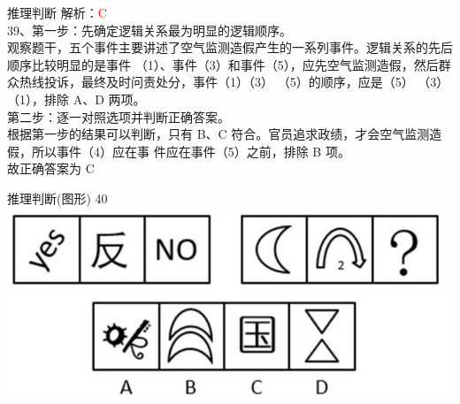 \documentclass[aspectratio=169]{beamer}
\begin{document}
\begin{frame}[t]{推理判断}
    解析：\textcolor{red}{C}\\
    39、第一步：先确定逻辑关系最为明显的逻辑顺序。\\
    观察题干，五个事件主要讲述了空气监测造假产生的一系列事件。逻辑关系的先后顺序比较明显的是事件
    （1）、事件（3）和事件（5），应先空气监测造假，然后群众热线投诉，最终及时问责处分，事件（1）（3）
    （5）的顺序，应是（5） （3） （1），排除 A、D 两项。\\
    第二步：逐一对照选项并判断正确答案。\\
    根据第一步的结果可以判断，只有 B、C 符合。官员追求政绩，才会空气监测造假，所以事件（4）应在事
    件应在事件（5）之前，排除 B 项。\\
    故正确答案为 C\\
\end{frame}



\begin{frame}[t]{推理判断(图形)}
    40\\
    \includegraphics[scale=0.25]{40}\\ 
\end{frame}
\end{document}
